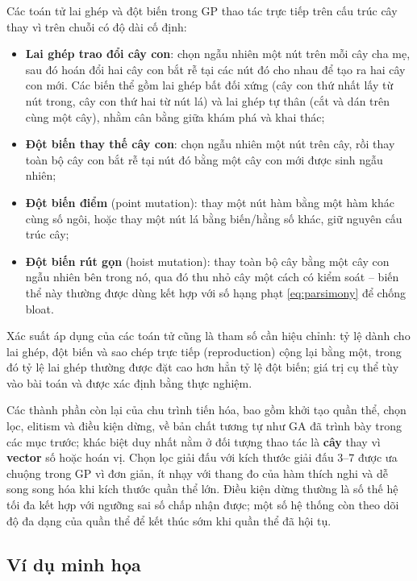 Các toán tử lai ghép và đột biến trong GP thao tác trực tiếp trên cấu
trúc cây thay vì trên chuỗi có độ dài cố định:
\begin{itemize}
    \item \textbf{Lai ghép trao đổi cây con}: chọn
    ngẫu nhiên một nút trên mỗi cây cha mẹ, sau đó hoán đổi hai cây con
    bắt rễ tại các nút đó cho nhau để tạo ra hai cây con mới. Các biến
    thể gồm lai ghép bất đối xứng (cây con thứ nhất lấy từ nút trong,
    cây con thứ hai từ nút lá) và lai ghép tự thân (cắt và dán trên
    cùng một cây), nhằm cân bằng giữa khám phá và khai thác;
    \item \textbf{Đột biến thay thế cây con}: chọn
    ngẫu nhiên một nút trên cây, rồi thay toàn bộ cây con bắt rễ tại nút
    đó bằng một cây con mới được sinh ngẫu nhiên;
    \item \textbf{Đột biến điểm} (point mutation): thay một nút hàm bằng
    một hàm khác cùng số ngôi, hoặc thay một nút lá bằng biến/hằng số
    khác, giữ nguyên cấu trúc cây;
    \item \textbf{Đột biến rút gọn} (hoist mutation): thay toàn bộ cây
    bằng một cây con ngẫu nhiên bên trong nó, qua đó thu nhỏ cây một
    cách có kiểm soát -- biến thể này thường được dùng kết hợp với số
    hạng phạt \eqref{eq:parsimony} để chống bloat.
\end{itemize}

Xác suất áp dụng của các toán tử cũng là tham số cần hiệu chỉnh: tỷ lệ
dành cho lai ghép, đột biến và sao chép trực tiếp (reproduction) cộng
lại bằng một, trong đó tỷ lệ lai ghép thường được đặt cao hơn hẳn tỷ
lệ đột biến; giá trị cụ thể tùy vào bài toán và được xác định bằng
thực nghiệm.

Các thành phần còn lại của chu trình tiến hóa, bao gồm khởi tạo quần
thể, chọn lọc, elitism và điều kiện dừng, về bản chất tương tự như GA
đã trình bày trong các mục trước; khác biệt duy nhất nằm ở đối tượng
thao tác là \textbf{cây} thay vì \textbf{vector} số hoặc hoán vị.
Chọn lọc giải đấu với kích thước giải đấu
$3$--$7$ được ưa chuộng trong GP vì đơn giản, ít nhạy với thang đo của
hàm thích nghi và dễ song song hóa khi kích thước quần thể lớn. Điều
kiện dừng thường là số thế hệ tối đa kết hợp với ngưỡng sai số chấp
nhận được; một số hệ thống còn theo dõi độ đa dạng của quần thể để kết
thúc sớm khi quần thể đã hội tụ.

\subsection*{Ví dụ minh họa}

